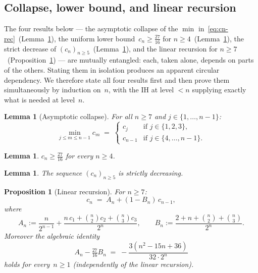 \documentclass[12pt]{article}
\newtheorem{proposition}[theorem]{Proposition}
\newtheorem{lemma}[theorem]{Lemma}
\theoremstyle{definition}
\theoremstyle{remark}
\begin{document}
\subsection{Collapse, lower bound, and linear recursion}\label{sec:joint}

The four results below — the asymptotic collapse of the $\min$
in~\eqref{eq:cn-rec}~(Lemma~\ref{lem:collapse}), the uniform lower
bound~$c_n\ge\tfrac{27}{16}$ for $n\geq 4$~(Lemma~\ref{lem:lower}), the strict
decrease of $(c_n)_{n\ge 5}$~(Lemma~\ref{lem:decreasing}), and the
linear recursion for $n\ge 7$~(Proposition~\ref{prop:linear}) — are
mutually entangled: each, taken alone, depends on parts of the
others.  Stating them in isolation produces an apparent circular
dependency.  We therefore state all four results first and then
prove them simultaneously by induction on~$n$, with the IH at level
$<n$ supplying exactly what is needed at level~$n$.

\begin{lemma}[Asymptotic collapse]\label{lem:collapse}
  For all $n\ge 7$ and $j\in\{1,\dots,n-1\}$:
  \begin{equation}\label{eq:collapse}
    \min_{j\le m\le n-1}c_m
    \;=\;
    \begin{cases}
      c_j     & \text{if } j\in\{1,2,3\},\\
      c_{n-1} & \text{if } j\in\{4,\dots,n-1\}.
    \end{cases}
  \end{equation}
\end{lemma}

\begin{lemma}\label{lem:lower}
  $c_n\ge\tfrac{27}{16}$ for every $n\ge 4$.
\end{lemma}

\begin{lemma}\label{lem:decreasing}
  The sequence $(c_n)_{n\ge 5}$ is strictly decreasing.
\end{lemma}

\begin{proposition}[Linear recursion]\label{prop:linear}
  For $n\ge 7$:
  \begin{equation}\label{eq:cn-linear}
    c_n \;=\; A_n + (1-B_n)\,c_{n-1},
  \end{equation}
  where
  \begin{equation}\label{eq:AB}
    A_n := \frac{n}{2^{n-1}}
    + \frac{n\,c_1+\binom{n}{2}c_2+\binom{n}{3}c_3}{2^n},
    \qquad
    B_n := \frac{2+n+\binom{n}{2}+\binom{n}{3}}{2^n}.
  \end{equation}
  Moreover the algebraic identity
  \begin{equation}\label{eq:alg-id}
    A_n - \tfrac{27}{16}B_n
    \;=\; -\frac{3(n^2-15n+36)}{32\cdot 2^n}
  \end{equation}
  holds for every~$n\ge 1$ (independently of the linear recursion).
\end{proposition}
\end{document}
